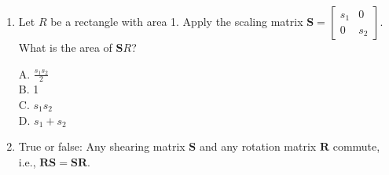 \begin{enumerate}
\item Let $R$ be a rectangle with area 1. Apply the scaling matrix $\mathbf{S} = \begin{bmatrix} s_1 & 0 \\ 0 & s_2 \end{bmatrix}.$ What is the area of $\mathbf{S}R$?

A. $\frac{s_1s_2}{2}$\\
B. 1\\
C. $s_1s_2$\\
D. $s_1 + s_2$\\

\item True or false: Any shearing matrix $\mathbf{S}$ and any rotation matrix $\mathbf{R}$ commute, i.e., $\mathbf{RS}=\mathbf{SR}$.

\end{enumerate}

\pagebreak
\shipoutAnswer

